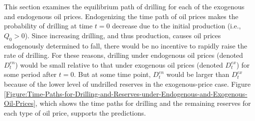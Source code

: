 This section examines the equilibrium path of drilling for each of the exogenous and endogenous oil prices. Endogenizing the time path of oil prices makes the probability of drilling at time $t = 0$ decrease due to the initial production (i.e., $Q_{0} > 0$). Since increasing drilling, and thus production, causes oil prices endogenously determined to fall, there would be no incentive to rapidly raise the rate of drilling. For these reasons, drilling under endogenous oil prices (denoted $D_{t}^{en}$) would be small relative to that under exogenous oil prices (denoted $D_{t}^{ex}$) for some period after $t = 0$. But at some time point, $D_{t}^{en}$ would be larger than $D_{t}^{ex}$ because of the lower level of undrilled reserves in the exogenous-price case. Figure \ref{Figure:Time-Paths-for-Drilling-and-Reserves-under-Endogenous-and-Exogenous-Oil-Prices}, which shows the time paths for drilling and the remaining reserves for each type of oil price, supports the predictions.
